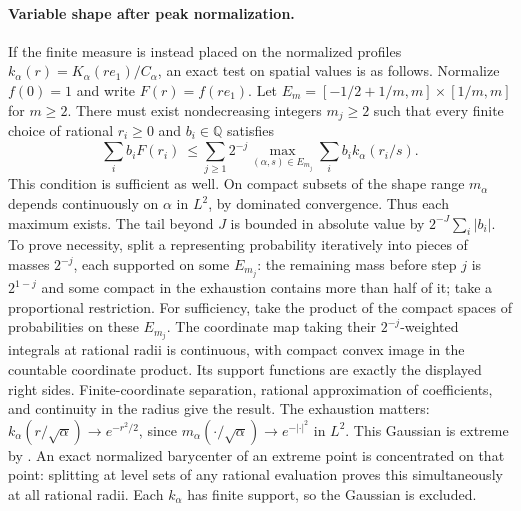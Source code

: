 \documentclass[11pt,a4paper]{article}
\numberwithin{equation}{section}
\begin{document}
\paragraph{Variable shape after peak normalization.}
If the finite measure is instead placed on the normalized profiles
$k_\alpha(r)=K_\alpha(r e_1)/C_\alpha$, an exact test on spatial
values is as follows. Normalize $f(0)=1$ and write $F(r)=f(r e_1)$.
Let $E_m=[-1/2+1/m,m]\times[1/m,m]$ for $m\ge 2$.
There must exist nondecreasing integers $m_j\ge2$ such that every finite
choice of rational $r_i\ge0$ and $b_i\in\mathbb Q$ satisfies
\[
 \sum_i b_i F(r_i)\ \le \sum_{j\ge1}2^{-j}
 \max_{(\alpha,s)\in E_{m_j}}\sum_i b_i k_\alpha(r_i/s).
\]
This condition is sufficient as well. On compact subsets of the shape
range $m_\alpha$ depends continuously on $\alpha$ in $L^2$, by dominated
convergence. Thus each maximum exists. The tail beyond $J$ is bounded
in absolute value by $2^{-J}\sum_i|b_i|$. To prove necessity, split a
representing probability iteratively into pieces of masses $2^{-j}$,
each supported on some $E_{m_j}$: the remaining mass before step $j$ is
$2^{1-j}$ and some compact in the exhaustion contains more than half of it;
take a proportional restriction. For sufficiency, take the product of
the compact spaces of probabilities on these $E_{m_j}$. The coordinate
map taking their $2^{-j}$-weighted integrals at rational radii is
continuous, with compact convex image in the countable coordinate
product. Its support functions are exactly the displayed right sides.
Finite-coordinate separation, rational approximation of coefficients,
and continuity in the radius give the result. The exhaustion matters:
$k_\alpha(r/\sqrt\alpha)\to e^{-r^2/2}$, since
$m_\alpha(\cdot/\sqrt\alpha)\to e^{-|\cdot|^2}$ in $L^2$.
This Gaussian is extreme by \cite[Sec.~4.2]{JMR2009}.
An exact normalized barycenter of an extreme point is concentrated on
that point: splitting at level sets of any rational evaluation proves
this simultaneously at all rational radii. Each $k_\alpha$ has finite
support, so the Gaussian is excluded.
\end{document}
